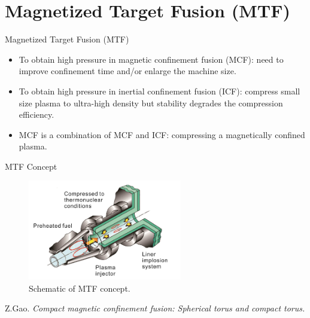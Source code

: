 \section{Magnetized Target Fusion (MTF)}
\begin{frame} {Magnetized Target Fusion (MTF)}
    \begin{itemize}
        \item To obtain high pressure in magnetic confinement fusion (MCF): need to improve confinement time and/or enlarge the machine size.
        \item To obtain high pressure in inertial confinement fusion (ICF): compress small size plasma to ultra-high density but stability degrades the compression efficiency.
        \item MCF is a combination of MCF and ICF: compressing a magnetically confined plasma.
    \end{itemize}
\end{frame}

\begin{frame} {MTF Concept}
    \begin{figure}
        \centering
        \includegraphics[width=0.6\textwidth]{figures/mtf-concept.png}
        \caption{Schematic of MTF concept. \cite{gao_2016_compact}}
        \label{fig:mtf-concept}
    \end{figure}

    \tiny \cite{gao_2016_compact} Z.Gao. \textit{Compact magnetic confinement fusion: Spherical torus and compact torus.}
\end{frame}


